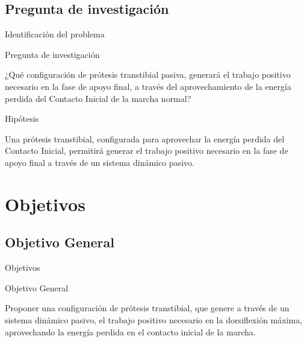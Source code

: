 \documentclass[10pt]{beamer}
\begin{document}
\subsection{Pregunta de investigación}
\begin{frame}{Identificación del problema}

\begin{block}{Pregunta de investigación}

¿Qué configuración de prótesis transtibial pasiva, generará el trabajo positivo necesario en la fase de apoyo final, a través del aprovechamiento de la energía perdida del Contacto Inicial de la marcha normal?

\end{block}
\begin{block}{Hipótesis}

Una prótesis transtibial, configurada para aprovechar la energía perdida del Contacto Inicial, permitirá generar el trabajo positivo necesario en la fase de apoyo final a través de un sistema dinámico pasivo.

\end{block}
\end{frame}

\section{Objetivos}

\subsection{Objetivo General}
\begin{frame}{Objetivos}

\begin{alertblock}{Objetivo General}

Proponer una configuración de prótesis transtibial, que genere a través de un
sistema dinámico pasivo, el trabajo positivo necesario en la dorsiflexión máxima, aprovechando la energía perdida en el contacto inicial de la marcha.
\end{alertblock}
\end{frame}
\end{document}
